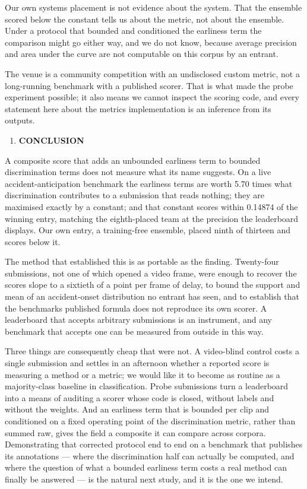 Our own system\textquotesingle s placement is not evidence about the system. That the ensemble scored below the constant tells us about the metric, not about the ensemble. Under a protocol that bounded and conditioned the earliness term the comparison might go either way, and we do not know, because average precision and area under the curve are not computable on this corpus by an entrant.

The venue is a community competition with an undisclosed custom metric, not a long-running benchmark with a published scorer. That is what made the probe experiment possible; it also means we cannot inspect the scoring code, and every statement here about the metric\textquotesingle s implementation is an inference from its outputs.

\begin{enumerate}
\def\labelenumi{\arabic{enumi}.}
\setcounter{enumi}{7}
\item
  \textbf{CONCLUSION}
\end{enumerate}

A composite score that adds an unbounded earliness term to bounded discrimination terms does not measure what its name suggests. On a live accident-anticipation benchmark the earliness terms are worth 5.70 times what discrimination contributes to a submission that reads nothing; they are maximised exactly by a constant; and that constant scores within 0.14874 of the winning entry, matching the eighth-placed team at the precision the leaderboard displays. Our own entry, a training-free ensemble, placed ninth of thirteen and scores below it.

The method that established this is as portable as the finding. Twenty-four submissions, not one of which opened a video frame, were enough to recover the score\textquotesingle s slope to a sixtieth of a point per frame of delay, to bound the support and mean of an accident-onset distribution no entrant has seen, and to establish that the benchmark\textquotesingle s published formula does not reproduce its own scorer. A leaderboard that accepts arbitrary submissions is an instrument, and any benchmark that accepts one can be measured from outside in this way.

Three things are consequently cheap that were not. A video-blind control costs a single submission and settles in an afternoon whether a reported score is measuring a method or a metric; we would like it to become as routine as a majority-class baseline in classification. Probe submissions turn a leaderboard into a means of auditing a scorer whose code is closed, without labels and without the weights. And an earliness term that is bounded per clip and conditioned on a fixed operating point of the discrimination metric, rather than summed raw, gives the field a composite it can compare across corpora. Demonstrating that corrected protocol end to end on a benchmark that publishes its annotations --- where the discrimination half can actually be computed, and where the question of what a bounded earliness term costs a real method can finally be answered --- is the natural next study, and it is the one we intend.

